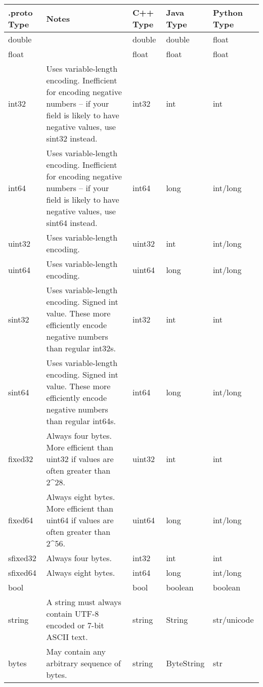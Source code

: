 \begin{longtable}[c]{@{}lllll@{}}
\toprule
.proto Type & Notes & C++ Type & Java Type & Python Type\tabularnewline
\midrule
\endhead
double & & double & double & float\tabularnewline
float & & float & float & float\tabularnewline
int32 & Uses variable-length encoding. Inefficient for encoding negative
numbers -- if your field is likely to have negative values, use sint32
instead. & int32 & int & int\tabularnewline
int64 & Uses variable-length encoding. Inefficient for encoding negative
numbers -- if your field is likely to have negative values, use sint64
instead. & int64 & long & int/long\tabularnewline
uint32 & Uses variable-length encoding. & uint32 & int &
int/long\tabularnewline
uint64 & Uses variable-length encoding. & uint64 & long &
int/long\tabularnewline
sint32 & Uses variable-length encoding. Signed int value. These more
efficiently encode negative numbers than regular int32s. & int32 & int &
int\tabularnewline
sint64 & Uses variable-length encoding. Signed int value. These more
efficiently encode negative numbers than regular int64s. & int64 & long
& int/long\tabularnewline
fixed32 & Always four bytes. More efficient than uint32 if values are
often greater than 2\^{}28. & uint32 & int & int\tabularnewline
fixed64 & Always eight bytes. More efficient than uint64 if values are
often greater than 2\^{}56. & uint64 & long & int/long\tabularnewline
sfixed32 & Always four bytes. & int32 & int & int\tabularnewline
sfixed64 & Always eight bytes. & int64 & long & int/long\tabularnewline
bool & & bool & boolean & boolean\tabularnewline
string & A string must always contain UTF-8 encoded or 7-bit ASCII text.
& string & String & str/unicode\tabularnewline
bytes & May contain any arbitrary sequence of bytes. & string &
ByteString & str\tabularnewline
\bottomrule
\end{longtable}
